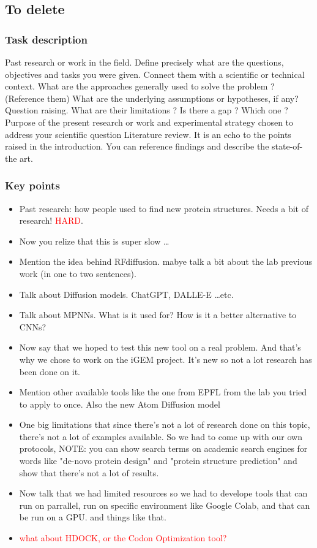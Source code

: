 \documentclass[11pt,a4paper]{article}
\begin{document}
\subsection{To delete}

\subsubsection{Task description}
Past research or work in the field.
Define precisely what are the questions, objectives and tasks you were 
given. Connect them with a scientific or technical context.
What are the approaches generally used to solve the problem ? 
(Reference them)
What are the underlying assumptions or hypotheses, if any?
Question raising.
What are their limitations ? 
Is there a gap ? Which one ?
Purpose of the present research or work and experimental strategy 
chosen to address your scientific question
Literature review.
It is an echo to the points raised in the introduction. You can 
reference findings and describe the state-of-the art.

\subsubsection{Key points}

\begin{itemize}
    \item Past research: how people used to find new protein 
    structures. Needs a bit of research! \textcolor{red}{HARD}.
    \item Now you relize that this is super slow \ldots
    \item Mention the idea behind RFdiffusion. mabye talk a bit about 
    the lab previous work (in one to two sentences).
    \item Talk about Diffusion models. ChatGPT, DALLE-E \ldots etc.
    \item Talk about MPNNs. What is it used for? How is it a better 
    alternative to CNNs?
    \item Now say that we hoped to test this new tool on a real 
    problem. And that's why we chose to work on the iGEM project. It's 
    new so not a lot research has been done on it.
    \item Mention other available tools like the one from EPFL from the 
    lab you tried to apply to once. Also the new Atom Diffusion model
    \item One big limitations that since there's not a lot of research 
    done on this topic, there's not a lot of examples available. So we 
    had to come up with our own protocols, NOTE: you can show search 
    terms on academic search engines for words like "de-novo protein 
    design" and "protein structure prediction" and show that there's 
    not a lot of results.
    \item Now talk that we had limited resources so we had to develope 
    tools that can run on parrallel, run on specific environment like 
    Google Colab, and that can be run on a GPU. and things like that.
    \item \textcolor{red}{what about HDOCK, or the Codon Optimization 
    tool?} 
\end{itemize}
\end{document}
